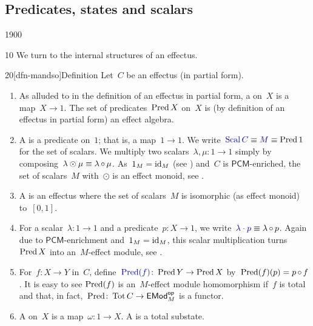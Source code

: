\subsection{Predicates, states and scalars}
\begin{parsec}{1900}%
\begin{point}{10}%
We turn to the internal structures of an effectus.
\end{point}
\begin{point}{20}[dfn-mandso]{Definition}%
Let~$C$ be an effectus (in partial form).
\begin{enumerate}
\item
As alluded to in the definition of an effectus in partial form,
a  on~$X$ is a map~$X \to 1$.
The set of predicates~$\operatorname{Pred} X$ on~$X$ is (by definition of an effectus
    in partial form) an effect algebra.
\item
A  is a predicate on~$1$; that is, a map~$1 \to 1$.
We write~$\Define{\Scal C} \equiv \Define{M} \equiv \Pred 1$ for the set of scalars.
We multiply two scalars~$\lambda,\mu \colon 1 \to 1$
    simply by composing~$\lambda \odot \mu \equiv \lambda \mathop{\circ} \mu$.
As~$1_M = \operatorname{id}_M$ (see ) and~$C$ is $\mathsf{PCM}$-enriched,
    the set of scalars~$M$ with~$\odot$
    is an effect monoid,
    see .
\item
A  is an effectus
where the set of scalars~$M$ is isomorphic (as effect monoid) to~$[0,1]$.
\item
For a scalar~$\lambda\colon 1\to 1$ and a predicate~$p\colon X \to 1$,
we write~$\Define{\lambda \cdot p} \equiv \lambda \after p$.
Again due to $\mathsf{PCM}$-enrichment and~$1_M = \operatorname{id}_M$,
this scalar multiplication
turns~$\operatorname{Pred} X$ into an~$M$-effect module, see .
\item
For~$f\colon X \to Y$ in~$C$,
        define~$\Define{\Pred(f)} \colon \Pred Y \to \Pred X$
    by~$\operatorname{Pred}(f)(p) = p \mathop{\circ} f$.
It is easy to see
$\operatorname{Pred}(f)$ is an~$M$-effect module homomorphism
if~$f$ is total
and that, in fact,~$\operatorname{Pred}\colon \operatorname{Tot} C \to \mathsf{EMod}^{\mathsf{op}}_M$
is a functor.
\item
A  on~$X$ is a map~$\omega\colon 1 \to X$.
A  is a total substate.

\end{enumerate}
\end{point}
\end{parsec}
